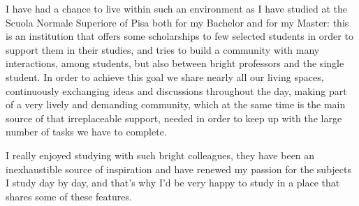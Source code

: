 \documentclass[12pt, a4paper]{article}
\begin{document}
I have had a chance to live within such an environment as I have studied at the Scuola Normale Superiore of Pisa both for my Bachelor and for my Master: this is an institution that offers some scholarships to few selected students in order to support them in their studies, and tries to build a community with many interactions, among students, but also between bright professors and the single student. In order to achieve this goal we share nearly all our living spaces, continuously exchanging ideas and discussions throughout the day, making part of a very lively and demanding community, which at the same time is the main source of that irreplaceable support, needed in order to keep up with the large number of tasks we have to complete.

I really enjoyed studying with such bright colleagues, they have been an inexhaustible source of inspiration and have renewed my passion for the subjects I study day by day, and that's why I'd be very happy to study in a place that shares some of these features.

\clearpage


\printbibliography
\end{document}
